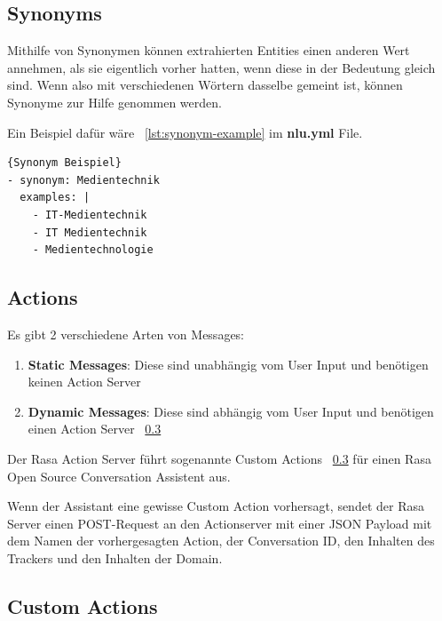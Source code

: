 \subsection{Synonyms}\label{subsection:synonyms}

Mithilfe von Synonymen können extrahierten Entities einen anderen Wert annehmen, als sie eigentlich vorher hatten, wenn diese in der Bedeutung gleich sind.
Wenn also mit verschiedenen Wörtern dasselbe gemeint ist, können Synonyme zur Hilfe genommen werden.\cite{synonyms}

Ein Beispiel dafür wäre ~\ref{lst:synonym-example} im \textbf{nlu.yml} File.

\begin{lstlisting}[label={lst:synonym-example},caption={Synonym Beispiel}]{Synonym Beispiel}
- synonym: Medientechnik
  examples: |
    - IT-Medientechnik
    - IT Medientechnik
    - Medientechnologie
\end{lstlisting}

\subsection{Actions}\label{subsec:actions}

Es gibt 2 verschiedene Arten von Messages:

\begin{enumerate}
    \item \textbf{Static Messages}: Diese sind unabhängig vom User Input und benötigen keinen Action Server\cite{actionsVid}
    \item \textbf{Dynamic Messages}: Diese sind abhängig vom User Input und benötigen einen Action Server ~\ref{subsec:custom-actions}\cite{actionsVid}
\end{enumerate}

Der Rasa Action Server führt sogenannte Custom Actions ~\ref{subsec:custom-actions} für einen Rasa Open Source Conversation Assistent aus.

Wenn der Assistant eine gewisse Custom Action vorhersagt, sendet der Rasa Server einen POST-Request an den Actionserver mit einer JSON Payload mit dem Namen der vorhergesagten Action, der Conversation ID, den Inhalten des Trackers und den Inhalten der Domain.\cite{actions}

\subsection{Custom Actions}\label{subsec:custom-actions}

